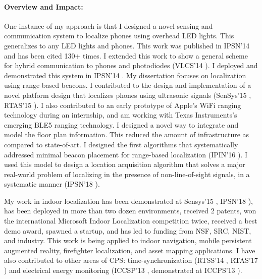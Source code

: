 \documentclass[10pt]{article}
\begin{document}
\paragraph{Overview and Impact: }
One instance of my approach is that I designed a novel sensing and communication system to localize phones using overhead LED lights. This generalizes to any LED lights and phones. This work was published in IPSN'14 \cite{rajagopal2014visual} and has been
cited 130+ times. I extended this work to show a general scheme for hybrid communication to phones and photodiodes (VLCS'14 \cite{rajagopal2014hybrid}). I deployed and demonstrated this system in IPSN'14 \cite{rajagopal2014demonstration}. My dissertation focuses on localization using range-based beacons. I contributed to the design and implementation of a novel platform design that localizes phones using ultrasonic signals (SenSys'15 \cite{lazik2015alps},
RTAS'15 \cite{rtas-alps-platform}). I also contributed to an early prototype of Apple's WiFi ranging technology during an internship, and am working with Texas Instruments's emerging BLE5 ranging technology. %
I designed a novel way to integrate and model the floor plan information. This reduced the amount of infrastructure as compared to state-of-art. I designed the first algorithms that systematically addressed minimal beacon placement for range-based localization (IPIN'16 \cite{rajagopal2016beacon}). I used this model to design a location acquisition algorithm that solves a major real-world problem of localizing in the presence of non-line-of-sight signals, in a systematic manner (IPSN'18 \cite{rajagopal2018enhancing}). 

My work in indoor localization has been demonstrated at
Sensys'15 \cite{lazik2015alpsdemo}, IPSN'18 \cite{rajagopal2018welcome}), has been deployed in more than two dozen environments, received 2 patents, won the international
Microsoft Indoor Localization competition twice, received a best demo
award, spawned a startup, and has led to funding from NSF, SRC, NIST, and
industry. This work is being applied to indoor navigation, mobile
persistent augmented reality, firefighter localization, and asset
mapping applications.  I have also contributed to other areas of CPS:
time-synchronization (RTSS'14 \cite{buevich2013hardware}, RTAS'17 \cite{dongare2017pulsar}) and electrical energy
monitoring (ICCSP'13 \cite{rajagopal2013magnetic}, demonstrated at ICCPS'13 \cite{rajagopal2013demo}).
\end{document}
